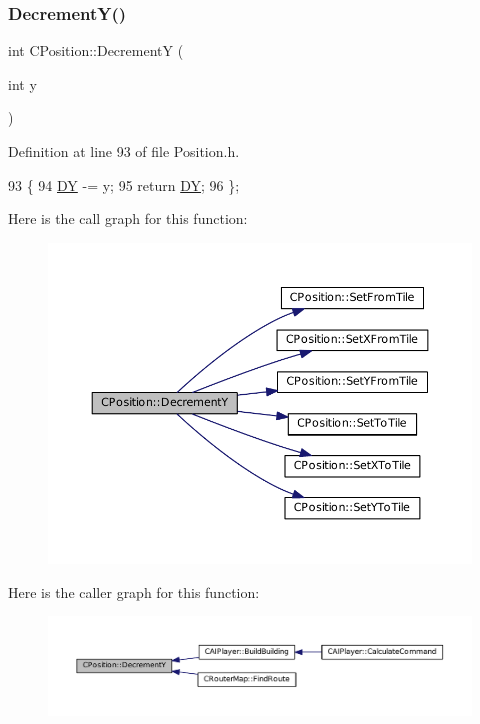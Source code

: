 \subsubsection{\texorpdfstring{Decrement\+Y()}{DecrementY()}}
{\footnotesize\ttfamily int C\+Position\+::\+DecrementY (\begin{DoxyParamCaption}\item[{int}]{y }\end{DoxyParamCaption})\hspace{0.3cm}{\ttfamily [inline]}}



Definition at line 93 of file Position.\+h.


\begin{DoxyCode}
93                              \{
94             \hyperlink{classCPosition_a84139c9e8eb547e7cf3cb851739943a4}{DY} -= y; 
95             \textcolor{keywordflow}{return} \hyperlink{classCPosition_a84139c9e8eb547e7cf3cb851739943a4}{DY};
96         \};
\end{DoxyCode}
Here is the call graph for this function\+:\nopagebreak
\begin{figure}[H]
\begin{center}
\leavevmode
\includegraphics[width=350pt]{classCPosition_a51ee44d9e0457d6277567fd8a66fdec7_cgraph}
\end{center}
\end{figure}
Here is the caller graph for this function\+:\nopagebreak
\begin{figure}[H]
\begin{center}
\leavevmode
\includegraphics[width=350pt]{classCPosition_a51ee44d9e0457d6277567fd8a66fdec7_icgraph}
\end{center}
\end{figure}
\hypertarget{classCPosition_a65124e3543c2d2e284e5eb517cd7f842}{}\label{classCPosition_a65124e3543c2d2e284e5eb517cd7f842} 
